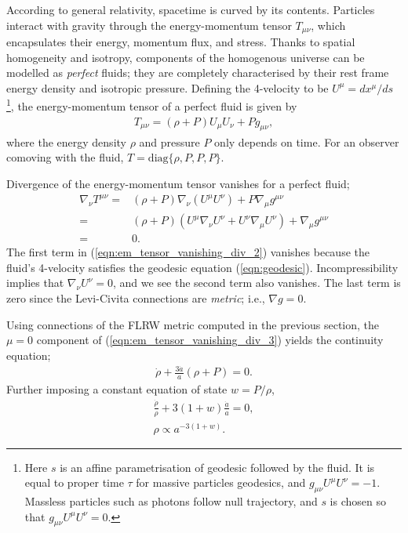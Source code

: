According to general relativity, spacetime is curved by its contents. Particles interact with gravity through the energy-momentum tensor $T_{\mu\nu}$, which encapsulates their energy, momentum flux, and stress. Thanks to spatial homogeneity and isotropy, components of the homogenous universe can be modelled as \textit{perfect} fluids; they are completely characterised by their rest frame energy density and isotropic pressure. Defining the 4-velocity to be $U^\mu = dx^\mu / ds$ \footnote{Here $s$ is an affine parametrisation of geodesic followed by the fluid. It is equal to proper time $\tau$ for massive particles geodesics, and $g_{\mu\nu}U^\mu U^\nu = -1$. Massless particles such as photons follow null trajectory, and $s$ is chosen so that $g_{\mu\nu}U^\mu U^\nu = 0$.}, the energy-momentum tensor of a perfect fluid is given by
\begin{align}
	T_{\mu\nu} = (\rho + P) U_\mu U_\nu + P g_{\mu\nu}, \label{eqn:em_tensor_perfect_fluid}
\end{align}
where the energy density $\rho$ and pressure $P$ only depends on time. For an observer comoving with the fluid, $T = \text{diag}\{\rho,P,P,P\}$.

Divergence of the energy-momentum tensor vanishes for a perfect fluid;
\begin{align}
	\nabla_\nu T^{\mu\nu} =& (\rho + P) \nabla_\nu \left( U^\mu U^\nu \right) + P \nabla_\mu g^{\mu\nu} \label{eqn:em_tensor_vanishing_div_1} \\
	=& (\rho + P) \left( U^\mu \nabla_\nu U^\nu + U^\nu \nabla_\mu U^\nu \right) + \nabla_\mu g^{\mu\nu} \label{eqn:em_tensor_vanishing_div_2}\\
	=& 0. \label{eqn:em_tensor_vanishing_div_3}
\end{align}
The first term in (\ref{eqn:em_tensor_vanishing_div_2}) vanishes because the fluid's 4-velocity satisfies the geodesic equation (\ref{eqn:geodesic}). Incompressibility implies that $\nabla_\nu U^\nu = 0$, and we see the second term also vanishes. The last term is zero since the Levi-Civita connections are \textit{metric}; i.e., $\nabla g = 0$.

Using connections of the FLRW metric computed in the previous section, the $\mu=0$ component of (\ref{eqn:em_tensor_vanishing_div_3}) yields the continuity equation;
\begin{align}
	\dot{\rho} + \frac{3\dot{a}}{a} \left( \rho + P \right) = 0. \label{eqn:continuity}
\end{align}
Further imposing a constant equation of state $w = P / \rho$, 
\begin{align}
	\frac{\dot{\rho}}{\rho} + 3(1+w) \frac{\dot{a}}{a} = 0, \\
	\rho \propto a^{-3(1+w)}. \label{eqn:energy_density_and_scale_factor}
\end{align}

